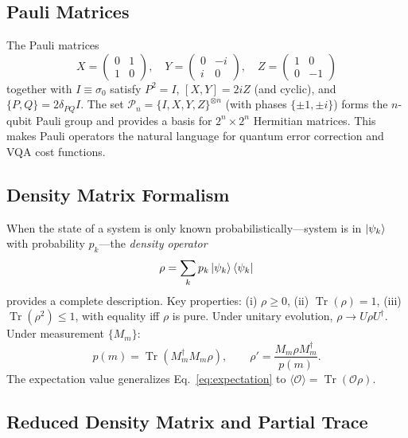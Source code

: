 \documentclass[aps, reprint, twocolumn, superscriptaddress, floatfix]{revtex4-2}
\begin{document}
\subsection{Pauli Matrices}
\label{ssec:pauli}

The Pauli matrices
\begin{equation}
  X = \begin{pmatrix}0&1\\1&0\end{pmatrix}, \quad
  Y = \begin{pmatrix}0&-i\\i&0\end{pmatrix}, \quad
  Z = \begin{pmatrix}1&0\\0&-1\end{pmatrix}
  \label{eq:pauli}
\end{equation}
together with $I\equiv\sigma_0$ satisfy $P^2=I$, $[X,Y]=2iZ$ (and cyclic),
and $\{P,Q\}=2\delta_{PQ}I$.  The set $\mathcal{P}_n = \{I,X,Y,Z\}^{\otimes n}$
(with phases $\{\pm 1,\pm i\}$) forms the $n$-qubit Pauli group and provides a
basis for $2^n\times 2^n$ Hermitian matrices.  This makes Pauli operators the
natural language for quantum error correction and VQA cost functions.

\subsection{Density Matrix Formalism}
\label{ssec:density}

When the state of a system is only known probabilistically---system is in
$\ket{\psi_k}$ with probability $p_k$---the \emph{density operator}
\begin{equation}
  \rho = \sum_k p_k \ket{\psi_k}\bra{\psi_k}
  \label{eq:density}
\end{equation}
provides a complete description.  Key properties:
(i) $\rho \ge 0$,
(ii) $\operatorname{Tr}(\rho) = 1$,
(iii) $\operatorname{Tr}(\rho^2) \le 1$, with equality iff $\rho$ is pure.
Under unitary evolution, $\rho \to U\rho U^\dagger$.  Under measurement $\{M_m\}$:
\begin{equation}
  p(m) = \operatorname{Tr}(M_m^\dagger M_m \rho), \qquad
  \rho' = \frac{M_m \rho M_m^\dagger}{p(m)}.
\end{equation}
The expectation value generalizes Eq.~\eqref{eq:expectation} to
$\langle\mathcal{O}\rangle = \operatorname{Tr}(\mathcal{O}\rho)$.

\subsection{Reduced Density Matrix and Partial Trace}
\label{ssec:reduced-density}
\end{document}
